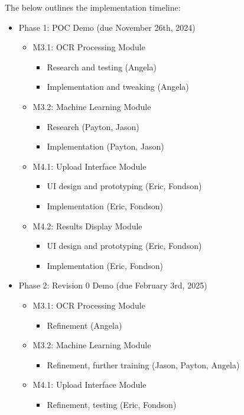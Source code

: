 \documentclass[12pt, titlepage]{article}
\begin{document}
\noindent The below outlines the implementation timeline:
\begin{itemize}
	\item Phase 1: POC Demo (due November 26th, 2024)
	\begin{itemize}
		\item M3.1: OCR Processing Module
		\begin{itemize}
			\item Research and testing (Angela)
			\item Implementation and tweaking (Angela)
		\end{itemize}
		\item M3.2: Machine Learning Module
		\begin{itemize}
			\item Research (Payton, Jason)
			\item Implementation (Payton, Jason)
		\end{itemize}
		\item M4.1: Upload Interface Module
		\begin{itemize}
			\item UI design and prototyping (Eric, Fondson)
			\item Implementation (Eric, Fondson)
		\end{itemize}
		\item M4.2: Results Display Module
		\begin{itemize}
			\item UI design and prototyping (Eric, Fondson)
			\item Implementation (Eric, Fondson)
		\end{itemize}
	\end{itemize}
	\item Phase 2: Revision 0 Demo (due February 3rd, 2025)
	\begin{itemize}
		\item M3.1: OCR Processing Module
		\begin{itemize}
			\item Refinement (Angela)
		\end{itemize}
		\item M3.2: Machine Learning Module
		\begin{itemize}
			\item Refinement, further training (Jason, Payton, Angela)
		\end{itemize}
		\item M4.1: Upload Interface Module
		\begin{itemize}
			\item Refinement, testing (Eric, Fondson)

\end{itemize}
\end{itemize}
\end{itemize}
\end{document}
